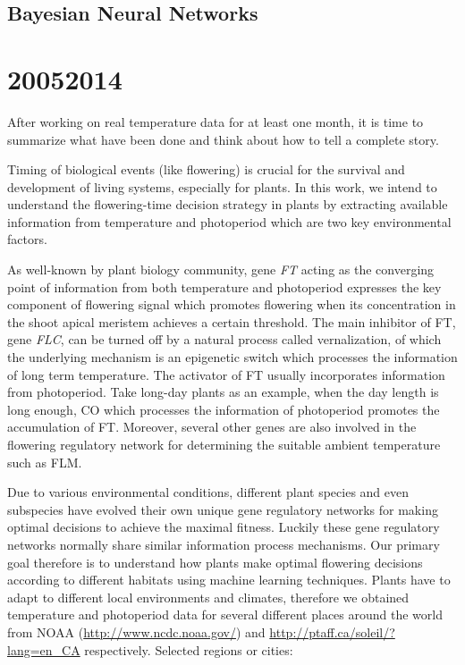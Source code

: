 \documentclass[paper=a4, fontsize=12pt]{scrartcl}	%
\numberwithin{equation}{section}					%
\numberwithin{figure}{section}					%
\numberwithin{table}{section}					%
\begin{document}
\subsection{Bayesian Neural Networks}
 

\section{20052014}
After working on real temperature data for at least one month, it is time to summarize what have been done and think about how to tell a complete story. 

Timing of biological events (like flowering) is crucial for the survival and development of living systems, especially for plants. In this work, we intend to understand the flowering-time decision strategy in plants by extracting available information from temperature and photoperiod which are two key environmental factors. 

As well-known by plant biology community, gene \emph{FT} acting as the converging point of information from both temperature and photoperiod expresses the key component of flowering signal which promotes flowering when its concentration in the shoot apical meristem achieves a certain threshold. The main inhibitor of FT, gene \emph{FLC}, can be turned off by a natural process called vernalization, of which the underlying mechanism is an epigenetic switch which processes the information of long term temperature. The activator of FT usually incorporates information from photoperiod. Take long-day plants as an example, when the day length is long enough, CO which processes the information of photoperiod promotes the accumulation of FT. Moreover, several other genes are also involved in the flowering regulatory network for determining the suitable ambient temperature such as FLM. 

Due to various environmental conditions, different plant species and even subspecies have evolved their own unique gene regulatory networks for making optimal decisions to achieve the maximal fitness. Luckily these gene regulatory networks normally share similar information process mechanisms. Our primary goal therefore is to understand how plants make optimal flowering decisions according to different habitats using machine learning techniques. 
Plants have to adapt to different local environments and climates, therefore we obtained temperature and photoperiod data for several different places around the world from NOAA (\url{http://www.ncdc.noaa.gov/}) and \url{http://ptaff.ca/soleil/?lang=en_CA} respectively. Selected regions or cities: 
\end{document}
